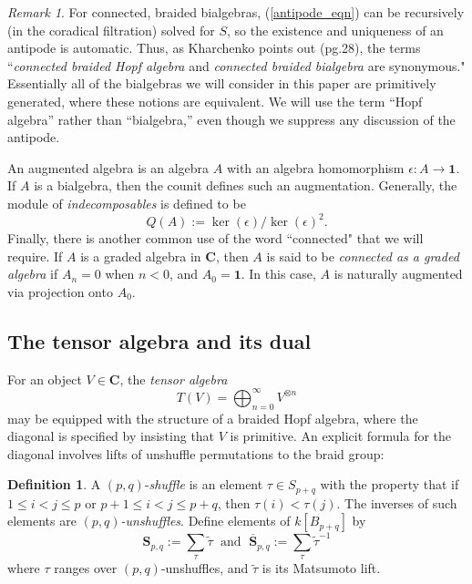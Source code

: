 \documentclass[12pt]{article}
\newcommand{\bC} {\mathbf{C}}
\newcommand{\one} {\mathbf{1}}
\newcommand{\bS} {\mathbf{S}}
\newcommand{\tautilde}{\widetilde{\tau}}
\theoremstyle{plain}
\theoremstyle{definition}
\newtheorem{defn}[thm]{Definition}
\theoremstyle{remark}
\newtheorem{rem}[thm]{Remark}
\begin{document}
\begin{rem}

For connected, braided bialgebras, (\ref{antipode_eqn}) can be recursively (in the coradical filtration) solved for $S$, so the existence and uniqueness of an antipode is automatic.  Thus, as Kharchenko points out \cite{kharchenko} (pg.28), the terms ``\emph{connected braided Hopf algebra} and \emph{connected braided bialgebra} are synonymous."  Essentially all of the bialgebras we will consider in this paper are primitively generated, where these notions are equivalent.  We will use the term ``Hopf algebra'' rather than ``bialgebra,'' even though we suppress any discussion of the antipode. 

\end{rem}

An augmented algebra is an algebra $A$ with an algebra homomorphism $\epsilon: A \to \one$.  If $A$ is a bialgebra, then the counit defines such an augmentation.  Generally, the module of \emph{indecomposables} is defined to be
%
$$Q(A) := \ker(\epsilon)/\ker(\epsilon)^2.$$
%
Finally, there is another common use of the word ``connected" that we will require.  If $A$ is a graded algebra in $\bC$, then $A$ is said to be \emph{connected as a graded algebra} if $A_n=0$ when $n<0$, and $A_0 = \one$.   In this case, $A$ is naturally augmented via projection onto $A_0$.  

\subsection{The tensor algebra and its dual} \label{tensor_section} 

For an object $V \in \bC$, the \emph{tensor algebra} 
%
$$T(V) = \bigoplus_{n=0}^{\infty} V^{\otimes n}$$
%
may be equipped with the structure of a braided Hopf algebra, where the diagonal is specified by insisting that $V$ is primitive.  An explicit formula for the diagonal involves lifts of unshuffle permutations to the braid group: 

\begin{defn} A $(p, q)$-\emph{shuffle} is an element $\tau \in S_{p+q}$ with the property that if $1 \leq i < j \leq p$ or $p+1 \leq
i < j \leq p+q$, then $\tau(i) < \tau(j)$.  The inverses of such elements are \emph{$(p,q)$-unshuffles}.  Define elements of $k[B_{p+q}]$ by
%
$$\bS_{p, q}:= \sum_{\tau} \tautilde \; \mbox{ and } \; \overline{\bS}_{p, q}:= \sum_{\tau} \tautilde^{-1}$$
%
where $\tau$ ranges over $(p,q)$-unshuffles, and $\tautilde$ is its Matsumoto lift. 

\end{defn}
\end{document}
